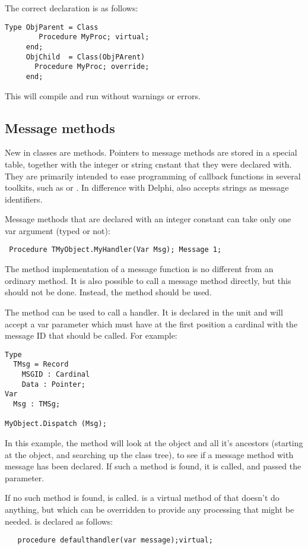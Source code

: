 The correct declaration is as follows:
\begin{verbatim}
Type ObjParent = Class
        Procedure MyProc; virtual;
     end;
     ObjChild  = Class(ObjPArent)
       Procedure MyProc; override;
     end;
\end{verbatim}
This will compile and run without warnings or errors.

\subsection{Message methods}
New in classes are  methods. Pointers to message methods are
stored in a special table, together with the integer or string cnstant that
they were declared with. They are primarily intended to ease programming of
callback functions in several  toolkits, such as  or
. In difference with Delphi, \fpc also accepts strings as message
identifiers.

Message methods that are declared with an integer constant can take only one
var argument (typed or not):
\begin{verbatim}
 Procedure TMyObject.MyHandler(Var Msg); Message 1;
\end{verbatim}
The method implementation of a message function is no different from an
ordinary method. It is also possible to call a message method directly,
but this should not be done. Instead, the  method
should be used.

The  method can be used to call a 
handler. It is declared in the  unit and will accept a var
parameter  which must have at the first position a cardinal with the
message ID that should be called. For example:
\begin{verbatim}
Type
  TMsg = Record
    MSGID : Cardinal
    Data : Pointer;
Var
  Msg : TMSg;

MyObject.Dispatch (Msg);
\end{verbatim}
In this example, the  method will look at the object and all
it's ancestors (starting at the object, and searching up the class tree),
to see if a message method with message  has been
declared. If such a method is found, it is called, and passed the
 parameter.

If no such method is found,  is called.
 is a virtual method of  that doesn't do
anything, but which can be overridden to provide any processing that might be
needed.  is declared as follows:
\begin{verbatim}
   procedure defaulthandler(var message);virtual;
\end{verbatim}

